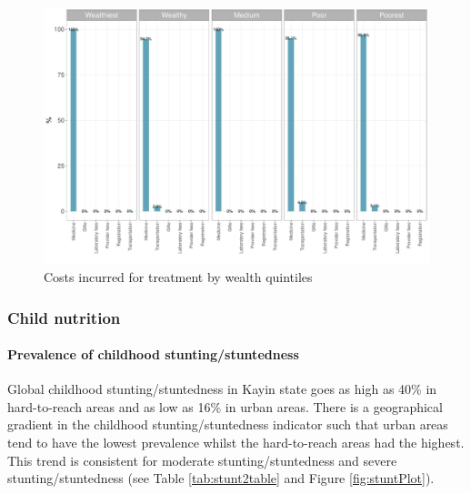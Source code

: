 \documentclass[12pt,a4paper]{article}
\let\oldparagraph\paragraph
\renewcommand{\paragraph}[1]{\oldparagraph{#1}\mbox{}}
\begin{document}
\begin{figure}[H]

{\centering \includegraphics{kayinReport_files/figure-latex/fever8plot-1} 

}

\caption{Costs incurred for treatment by wealth quintiles}\label{fig:fever8plot}
\end{figure}

\hypertarget{cnutrition-results}{%
\subsubsection{Child nutrition}\label{cnutrition-results}}

\hypertarget{stunting}{%
\paragraph{Prevalence of childhood stunting/stuntedness}\label{stunting}}

Global childhood stunting/stuntedness in Kayin state goes as high as 40\% in hard-to-reach areas and as low as 16\% in urban areas. There is a geographical gradient in the childhood stunting/stuntedness indicator such that urban areas tend to have the lowest prevalence whilst the hard-to-reach areas had the highest. This trend is consistent for moderate stunting/stuntedness and severe stunting/stuntedness (see Table \ref{tab:stunt2table} and Figure \ref{fig:stuntPlot}).
\end{document}

